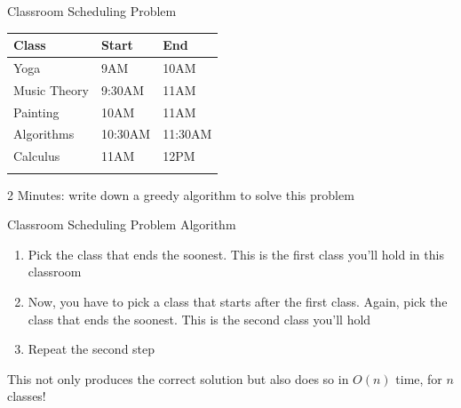\documentclass[
  ignorenonframetext,
]{beamer}
\providecommand{\tightlist}{%
  \setlength{\itemsep}{0pt}\setlength{\parskip}{0pt}}\usepackage{longtable,booktabs,array}
\begin{document}
\begin{frame}{Classroom Scheduling Problem}
\protect\hypertarget{classroom-scheduling-problem}{}

\begin{longtable}[]{@{}lll@{}}
\toprule\noalign{}
Class & Start & End \\
\midrule\noalign{}
\endhead
Yoga & 9AM & 10AM \\
Music Theory & 9:30AM & 11AM \\
Painting & 10AM & 11AM \\
Algorithms & 10:30AM & 11:30AM \\
Calculus & 11AM & 12PM \\
\bottomrule\noalign{}
\end{longtable}

2 Minutes: write down a greedy algorithm to solve this problem
\end{frame}

\begin{frame}{Classroom Scheduling Problem}
\protect\hypertarget{classroom-scheduling-problem-1}{}
Algorithm

\begin{enumerate}
\item
  Pick the class that ends the soonest. This is the first class you'll
  hold in this classroom
\item
  Now, you have to pick a class that starts after the first class.
  Again, pick the class that ends the soonest. This is the second class
  you'll hold
\item
  Repeat the second step
\end{enumerate}

This not only produces the correct solution but also does so in \(O(n)\)
time, for \(n\) classes!
\end{frame}
\end{document}
